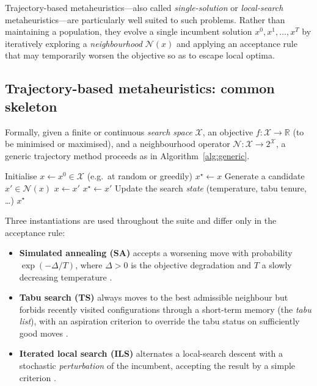 \documentclass[11pt,a4paper]{article}
\newcommand{\R}{\mathbb{R}}
\begin{document}
Trajectory-based metaheuristics---also called \emph{single-solution} or
\emph{local-search} metaheuristics---are particularly well suited to such
problems. Rather than maintaining a population, they evolve a single incumbent
solution $x^{0}, x^{1}, \dots, x^{T}$ by iteratively exploring a
\emph{neighbourhood} $\mathcal{N}(x)$ and applying an acceptance rule that may
temporarily worsen the objective so as to escape local optima.

\subsection{Trajectory-based metaheuristics: common skeleton}

Formally, given a finite or continuous \emph{search space} $\mathcal{X}$, an
objective $f:\mathcal{X}\to\R$ (to be minimised or maximised), and a
neighbourhood operator $\mathcal{N}:\mathcal{X}\to 2^{\mathcal{X}}$, a generic
trajectory method proceeds as in Algorithm~\ref{alg:generic}.

\begin{algorithm}[H]
\caption{Generic trajectory-based metaheuristic}
\label{alg:generic}
\begin{algorithmic}[1]
\State Initialise $x \leftarrow x^{0} \in \mathcal{X}$ (e.g.\ at random or greedily)
\State $x^{\star} \leftarrow x$ 
    \State Generate a candidate $x' \in \mathcal{N}(x)$
        \State $x \leftarrow x'$
    \EndIf
        \State $x^{\star} \leftarrow x'$
    \EndIf
    \State Update the search \emph{state} (temperature, tabu tenure, \dots)
\EndWhile
\State \Return $x^{\star}$
\end{algorithmic}
\end{algorithm}

Three instantiations are used throughout the suite and differ only in the
acceptance rule:
\begin{itemize}
  \item \textbf{Simulated annealing (SA)} accepts a worsening move with
        probability $\exp(-\Delta / T)$, where $\Delta>0$ is the objective
        degradation and $T$ a slowly decreasing temperature
        \cite{kirkpatrick1983}.
  \item \textbf{Tabu search (TS)} always moves to the best admissible neighbour
        but forbids recently visited configurations through a short-term memory
        (the \emph{tabu list}), with an aspiration criterion to override the
        tabu status on sufficiently good moves \cite{glover1989}.
  \item \textbf{Iterated local search (ILS)} alternates a local-search descent
        with a stochastic \emph{perturbation} of the incumbent, accepting the
        result by a simple criterion \cite{lourenco2003}.
\end{itemize}
\end{document}
